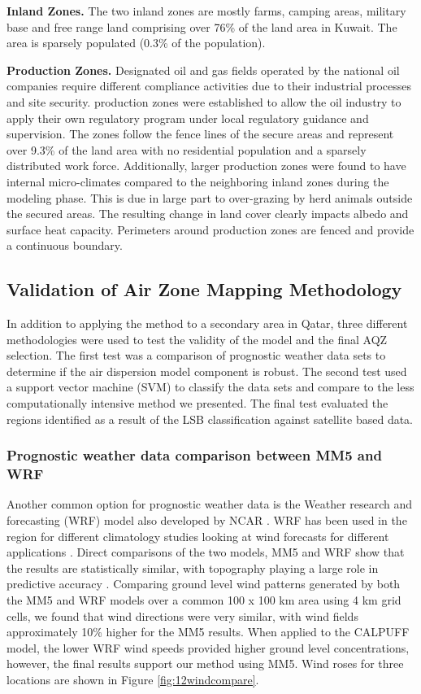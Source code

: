 \textbf{Inland Zones.} The two inland zones are mostly farms, camping areas, military base and free range land comprising over 76\% of the land area in Kuwait. The area is sparsely populated (0.3\% of the population).  

\textbf{Production Zones.} Designated oil and gas fields operated by the national oil companies require different compliance activities due to their industrial processes and site security.  production zones were established to allow the oil industry to apply their own regulatory program under local regulatory guidance and supervision. The zones follow the fence lines of the secure areas and represent over 9.3\% of the land area with no residential population and a sparsely distributed work force. Additionally, larger production zones were found to have internal micro-climates compared to the neighboring inland zones during the modeling phase.  This is due in large part to over-grazing by herd animals outside the secured areas.  The resulting change in land cover clearly impacts albedo and surface heat capacity. Perimeters around production zones are fenced and provide a continuous boundary.

\subsection{Validation of Air Zone Mapping Methodology}

In addition to applying the method to a secondary area in Qatar, three different methodologies were used to test the validity of the model and the final AQZ selection. The first test was a comparison of prognostic weather data sets to determine if the air dispersion model component is robust. The second test used a support vector machine (SVM) to classify the data sets and compare to the less computationally intensive method we presented. The final test evaluated the regions identified as a result of the LSB classification against satellite based data.

\subsubsection{Prognostic weather data comparison between MM5 and WRF}

Another common option for prognostic weather data is the Weather research and forecasting (WRF) model also developed by NCAR \citep{Skamarock2008}. WRF has been used in the region for different climatology studies looking at wind forecasts for different applications \citep{Amjad2015}. Direct comparisons of the two models, MM5 and WRF show that the results are statistically similar, with topography playing a large role in predictive accuracy \citep{Gsella2014, Henmi2004}. Comparing ground level wind patterns generated by both the MM5 and WRF models over a common 100 x 100 km area using 4 km grid cells, we found that wind directions were very similar, with wind fields approximately 10\% higher for the MM5 results. When applied to the CALPUFF model, the lower WRF wind speeds provided higher ground level concentrations, however, the final results support our method using MM5. Wind roses for three locations are shown in Figure \ref{fig:12windcompare}.
 	 

